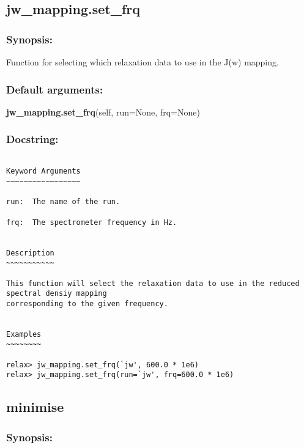 {\scriptsize
\begin{verbatim}

\end{verbatim}
}



\newpage

\subsection{jw\_mapping.set\_frq}


\subsubsection{Synopsis:}

Function for selecting which relaxation data to use in the J(w) mapping.

\subsubsection{Default arguments:}

\textsf{\textbf{jw\_mapping.set\_frq}(self, run=None, frq=None)
}


\subsubsection{Docstring:}

{\scriptsize
\begin{verbatim}

Keyword Arguments
~~~~~~~~~~~~~~~~~

run:  The name of the run.

frq:  The spectrometer frequency in Hz.


Description
~~~~~~~~~~~

This function will select the relaxation data to use in the reduced spectral densiy mapping
corresponding to the given frequency.


Examples
~~~~~~~~

relax> jw_mapping.set_frq(`jw', 600.0 * 1e6)
relax> jw_mapping.set_frq(run=`jw', frq=600.0 * 1e6)
\end{verbatim}
}



\newpage

\subsection{minimise}


\subsubsection{Synopsis:}

